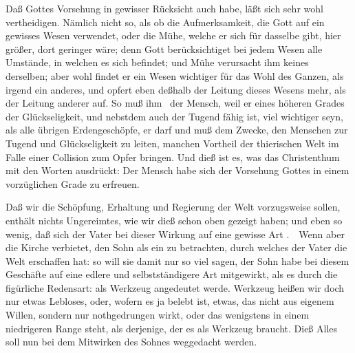 \begin{aufza}
\item Daß Gottes Vorsehung in gewisser Rücksicht auch  habe, läßt sich sehr wohl vertheidigen. Nämlich nicht so, als ob die Aufmerksamkeit, die Gott auf ein gewisses Wesen verwendet, oder die Mühe, welche er sich für dasselbe gibt, hier größer, dort geringer wäre; denn Gott berücksichtiget bei jedem Wesen alle Umstände, in welchen es sich befindet; und Mühe verursacht ihm keines derselben; aber wohl findet er ein Wesen wichtiger für das Wohl des Ganzen, als irgend ein anderes, und opfert eben deßhalb der Leitung dieses Wesens mehr, als der Leitung anderer auf. So muß ihm \zB\ der Mensch, weil er eines höheren Grades der Glückseligkeit, und nebstdem auch der Tugend fähig ist, viel wichtiger seyn, als alle übrigen Erdengeschöpfe, er darf und muß dem Zwecke, den Menschen zur Tugend und Glückseligkeit zu leiten, manchen Vortheil der thierischen Welt im Falle einer Collision zum Opfer bringen. Und dieß ist es, was das Christenthum mit den Worten ausdrückt: Der Mensch habe sich der Vorsehung Gottes in einem vorzüglichen Grade zu erfreuen.
\item Daß wir die Schöpfung, Erhaltung und Regierung der Welt vorzugsweise  sollen, enthält nichts Ungereimtes, wie wir dieß schon oben gezeigt haben; und eben so wenig, daß sich der Vater bei dieser Wirkung auf eine gewisse Art .~\ Wenn aber die Kirche verbietet, den Sohn als ein  zu betrachten, durch welches der Vater die Welt erschaffen hat: so will sie damit nur so viel sagen, der Sohn habe bei diesem Geschäfte auf eine edlere und selbstständigere Art mitgewirkt, als es durch die figürliche Redensart: als Werkzeug angedeutet werde. Werkzeug heißen wir doch nur etwas Lebloses, oder, wofern es ja belebt ist, etwas, das nicht aus eigenem Willen, sondern nur nothgedrungen wirkt, oder das wenigstens in einem niedrigeren Range steht, als derjenige, der es als Werkzeug braucht. Dieß Alles soll nun bei dem Mitwirken des Sohnes weggedacht werden.
\end{aufza}

